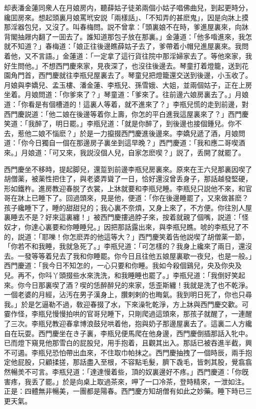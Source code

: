 却表潘金蓮同衆人在月娘房内，聽薛姑子徒弟兩個小姑子唱佛曲兒，到起更時分，纔囬房來。想起頭裏月娘罵玳安説「兩樣話」、「不知弄的甚麽鬼」，因是向牀上摸那淫器包兒，又沒了。叫春梅問。説不曾拿：「頭裏娘不在時，爹進屋裏來，向牀背閣抽屜内翻了一囬去了。誰知道那包子放在那裏。」金蓮道：「他多喒進來，我怎就不知道？」春梅道：「娘正往後邊瞧薛姑子去了，爹帶着小帽兒進屋裏來。我問着他，又不言語。」金蓮道：「一定拿了這行貨往院中那淫婦家去了。等他來家，我好生問他。」不想西門慶來家，見夜深了，也沒往後邊去。琴童打着燈籠，送到花園角門首，西門慶就往李瓶兒屋裏去了。琴童兒把燈籠還交送到後邊，小玉收了。月娘與李嬌兒、孟玉樓、潘金蓮、李瓶兒、孫雪娥、大姐，並兩個姑子，正在上房坐着。月娘問道：「你爹來了？」琴童道：「爹來了。往前邊六娘房裏去了。」月娘道：「你看是有個槽道的！這裏人等着，就不進來了？」李瓶兒慌的走到前邊，對西門慶説道：「他二娘在後邊等着你上壽，你怎的平白進我這屋裏來了？」西門慶笑道：「我醉了，明日罷。」李瓶兒道：「就是你醉了，到後邊也接個鍾兒。你不去，惹他二娘不惱麽？」於是一力攛掇西門慶進後邊來。李嬌兒遞了酒，月娘問道：「你今日獨自一個在那邊房子裏坐到這早晚？」西門慶道：「我和應二哥喫酒來。」月娘道：「可又來，我説沒個人兒，自家怎麽喫？」説了，丢開了就罷了。

西門慶坐不移時，提起脚兒，還踅到前邊李瓶兒房裏來。原來在王六兒那裏因喫了胡僧薬，被薬性把住了，與老婆弄聳了一日，恰好還沒曾丢身子，那話越發堅硬，形如鐵杵。進房教迎春脱了衣裳，上牀就要和李瓶兒睡。李瓶兒只説他不來，和官哥在牀上已睡下了。回過頭來，見是他，便道：「你在後邊睡罷了，又來做甚麽？孩子纔睡下了，睡的甜甜兒的；我心裏不奈煩，又身上來了，不方便。你往別人屋裏睡去不是？好來這裏纏！」被西門慶摟過脖子來，按着就親了個嘴，説道：「怪奴才，你達心裏要和你睡睡兒。」因把那話露出來，與李瓶兒瞧。唬的李瓶兒了不的，説道：「耶嚛！你怎麽弄的他這等大？」西門慶笑着告他説喫了胡僧薬一節，「你若不和我睡，我就急死了。」李瓶兒道：「可怎樣的？我身上纔來了兩日，還沒去。一發等等着兒去了我和你睡罷。你今日且往他五娘屋裏歇一夜兒，也是一般。」西門慶道：「我今日不知怎的，一心只要和你睡。我如今殺個鷄兒，央及你央及兒。再不，你呌丫頭掇些水來洗洗，和我睡睡也罷了。」李瓶兒道：「我倒好笑起來。你今日那裏喫了酒？喫的恁醉醉兒的來家，恁歪斯纏！我就是洗了也不乾淨。一個老婆的月經，沾汚在男子漢身上，臢剌剌的也晦氣。我到明日死了，你也只尋我。」於是乞逼勒不過，敎迎春掇了水，下來澡牝乾淨，方上牀與西門慶交歡。可霎作怪，李瓶兒慢慢拍哄的官哥兒睡下，只剛爬過這頭來，那孩子就醒了，一連醒了三次。李瓶兒教迎春拿博浪鼓兒哄着他，抱與奶子那邊屋裏去了。這裏二人方纔自在玩耍。西門慶坐在き子裏，李瓶兒便馬爬在他身邊，西門慶倒插那話入牝中。已而燈下窺見他那雪白的屁股兒，用手抱着，且觀其出入。那話已被吞進半截，興不可遏。李瓶兒恐怕帶出血來，不住取巾帕抹之。西門慶抽拽了一個時辰，兩手抱定他屁股，只顧揉搓，那話盡入至根，不容點毛髮，臍下毳毛，皆刺其股，覺翕翕然暢羙不可言。李瓶兒道：「達達慢着些，頂的奴裏邊好不疼。」西門慶道：「你旣害疼，我丢了罷。」於是向桌上取過茶來，呷了一口冷茶，登時精來，一泄如注。正是：四體無非暢美，一團都是陽春。西門慶方知胡僧有如此之妙藥。睡下時已三更天氣。

